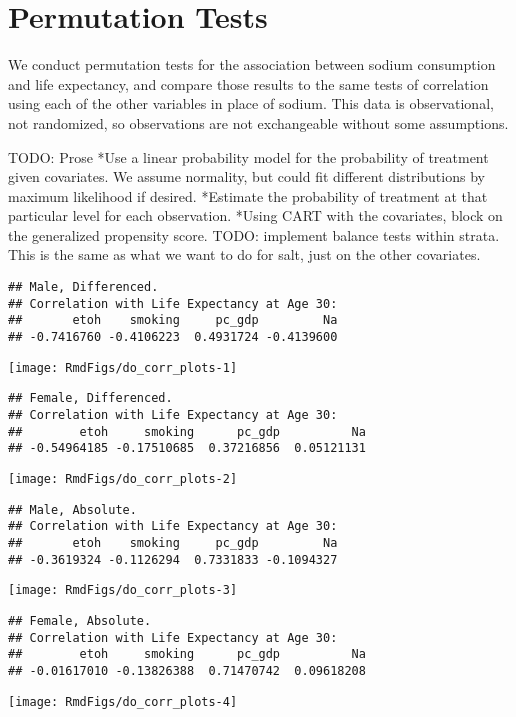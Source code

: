 \documentclass[11pt]{article}\usepackage[]{graphicx}\usepackage[]{color}
\makeatletter
\def\maxwidth{ %
  \ifdim\Gin@nat@width>\linewidth
    \linewidth
  \else
    \Gin@nat@width
  \fi
}
\newenvironment{kframe}{%
 \def\at@end@of@kframe{}%
 \ifinner\ifhmode%
  \def\at@end@of@kframe{\end{minipage}}%
  \begin{minipage}{\columnwidth}%
 \fi\fi%
 \def\FrameCommand##1{\hskip\@totalleftmargin \hskip-\fboxsep
 \colorbox{shadecolor}{##1}\hskip-\fboxsep
     \hskip-\linewidth \hskip-\@totalleftmargin \hskip\columnwidth}%
 \MakeFramed {\advance\hsize-\width
   \@totalleftmargin\z@ \linewidth\hsize
   \@setminipage}}%
 {\par\unskip\endMakeFramed%
 \at@end@of@kframe}
\newenvironment{knitrout}{}{} %
\makeatother
\begin{document}
\section{Permutation Tests}

We conduct permutation tests for the association between sodium consumption and life expectancy, and compare those results to the same tests of correlation using each of the other variables in place of sodium.
This data is observational, not randomized, so observations are not exchangeable without some assumptions.


TODO: Prose
*Use a linear probability model for the probability of treatment given covariates. We assume normality, but could fit different distributions by maximum likelihood if desired.
*Estimate the probability of treatment at that particular level for each observation. 
*Using CART with the covariates, block on the generalized propensity score.
TODO: implement balance tests within strata. This is the same as what we want to do for salt, just on the other covariates.



\begin{knitrout}
\color{fgcolor}\begin{kframe}
\begin{verbatim}
## Male, Differenced.
## Correlation with Life Expectancy at Age 30:
##       etoh    smoking     pc_gdp         Na 
## -0.7416760 -0.4106223  0.4931724 -0.4139600
\end{verbatim}
\end{kframe}
\texttt{[image: RmdFigs/do\_corr\_plots-1]} 
\begin{kframe}\begin{verbatim}
## Female, Differenced.
## Correlation with Life Expectancy at Age 30:
##        etoh     smoking      pc_gdp          Na 
## -0.54964185 -0.17510685  0.37216856  0.05121131
\end{verbatim}
\end{kframe}
\texttt{[image: RmdFigs/do\_corr\_plots-2]} 
\begin{kframe}\begin{verbatim}
## Male, Absolute.
## Correlation with Life Expectancy at Age 30:
##       etoh    smoking     pc_gdp         Na 
## -0.3619324 -0.1126294  0.7331833 -0.1094327
\end{verbatim}
\end{kframe}
\texttt{[image: RmdFigs/do\_corr\_plots-3]} 
\begin{kframe}\begin{verbatim}
## Female, Absolute.
## Correlation with Life Expectancy at Age 30:
##        etoh     smoking      pc_gdp          Na 
## -0.01617010 -0.13826388  0.71470742  0.09618208
\end{verbatim}
\end{kframe}
\texttt{[image: RmdFigs/do\_corr\_plots-4]} 

\end{knitrout}
\end{document}
